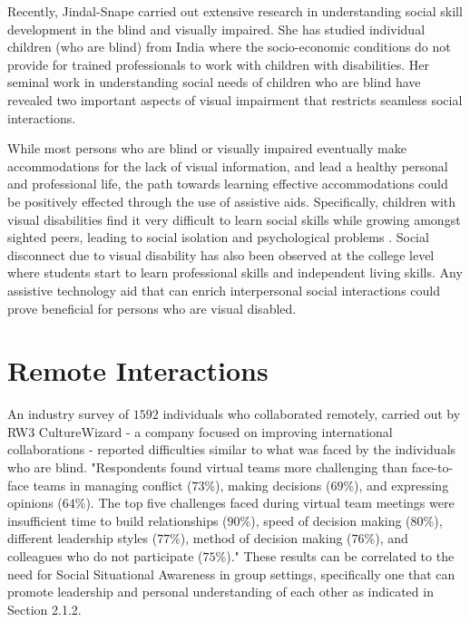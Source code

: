 \documentclass[oneside,11pt]{memoir}
\begin{document}
Recently, Jindal-Snape \cite{jindal-snape_generalization_2004} \cite{jindal-snape_use_2005} \cite{jindal-snape_using_1998} carried out extensive research in understanding social skill development in the blind and visually impaired. She has studied individual children (who are blind) from India where the socio-economic conditions do not provide for trained professionals to work with children with disabilities. Her seminal work in understanding social needs of children who are blind have revealed two important aspects of visual impairment that restricts seamless social interactions.

While most persons who are blind or visually impaired eventually make accommodations for the lack of visual information, and lead a healthy personal and professional life, the path towards learning effective accommodations could be positively effected through the use of assistive aids. Specifically, children with visual disabilities find it very difficult to learn social skills while growing amongst sighted peers, leading to social isolation and psychological problems \cite{jindal-snape_generalization_2004}. Social disconnect due to visual disability has also been observed at the college level \cite{shinohara_blind_2009} where students start to learn professional skills and independent living skills. Any assistive technology aid that can enrich interpersonal social interactions could prove beneficial for persons who are visual disabled.

\section{Remote Interactions}
An industry survey \cite{solomon_challenges_2010} of $1592$ individuals who collaborated remotely, carried out by RW3 CultureWizard - a company focused on improving international collaborations - reported difficulties similar to what was faced by the individuals who are blind. "Respondents found virtual teams more challenging than face-to-face teams in managing conflict ($73$\%), making decisions ($69$\%), and expressing opinions ($64$\%). The top five challenges faced during virtual team meetings were insufficient time to build relationships ($90$\%), speed of decision making ($80$\%), different leadership styles ($77$\%), method of decision making ($76$\%), and colleagues who do not participate ($75$\%)." These results can be correlated to the need for Social Situational Awareness in group settings, specifically one that can promote leadership and personal understanding of each other as indicated in Section 2.1.2.
\end{document}
